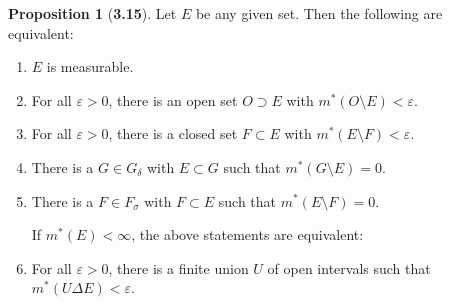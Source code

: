 \documentclass[12pt]{article}
\renewcommand{\epsilon}{\varepsilon}
\theoremstyle{definition}
\newtheorem*{prop}{Proposition}
\begin{document}
\begin{prop}[\textbf{3.15}]

    
    Let \( E \) be any given set. Then the following are equivalent:
        \begin{enumerate}[label = (\roman{*})]
            \item \( E \) is measurable.
            \item For all \( \epsilon > 0 \), there is an open set \( O \supset E \) with \( m^{*}(O \setminus E) < \epsilon \).
            \item For all \( \epsilon > 0 \), there is a closed set \( F \subset E \) with \( m^{*}(E \setminus F) < \epsilon \).
            \item There is a \( G \in G_{\delta} \) with \( E \subset G \) such that \( m^{*}(G \setminus E) = 0 \). 
            \item There is a \( F \in F_{\sigma} \) with \( F \subset E \) such that \( m^{*}(E \setminus F) = 0 \). 
            
            \noindent If \( m^{*}(E) < \infty \), the above statements are equivalent:

            \item For all \( \epsilon > 0 \), there is a finite union \( U \) of open intervals such that \( m^{*}(U \Delta E) < \epsilon \).
        \end{enumerate}
    
\end{prop}
\end{document}
